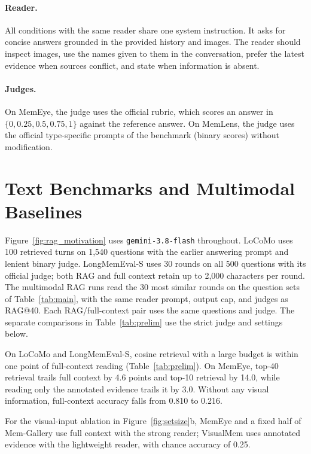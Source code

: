 \paragraph{Reader.} All conditions with the same reader share one system instruction. It asks for concise answers grounded in the provided history and images. The reader should inspect images, use the names given to them in the conversation, prefer the latest evidence when sources conflict, and state when information is absent.

\paragraph{Judges.} On MemEye, the judge uses the official rubric, which scores an answer in $\{0, 0.25, 0.5, 0.75, 1\}$ against the reference answer. On MemLens, the judge uses the official type-specific prompts of the benchmark (binary scores) without modification.

\section{Text Benchmarks and Multimodal Baselines}
\label{app:text}

Figure~\ref{fig:rag_motivation} uses \texttt{gemini-3.8-flash} throughout. LoCoMo uses 100 retrieved turns on 1,540 questions with the earlier answering prompt and lenient binary judge. LongMemEval-S uses 30 rounds on all 500 questions with its official judge; both RAG and full context retain up to 2,000 characters per round. The multimodal RAG runs read the 30 most similar rounds on the question sets of Table~\ref{tab:main}, with the same reader prompt, output cap, and judges as RAG@40. Each RAG/full-context pair uses the same questions and judge. The separate comparisons in Table~\ref{tab:prelim} use the strict judge and settings below.

On LoCoMo and LongMemEval-S, cosine retrieval with a large budget is within one point of full-context reading (Table~\ref{tab:prelim}). On MemEye, top-40 retrieval trails full context by 4.6 points and top-10 retrieval by 14.0, while reading only the annotated evidence trails it by 3.0. Without any visual information, full-context accuracy falls from 0.810 to 0.216.

For the visual-input ablation in Figure~\ref{fig:setsize}b, MemEye and a fixed half of Mem-Gallery use full context with the strong reader; VisualMem uses annotated evidence with the lightweight reader, with chance accuracy of 0.25.

